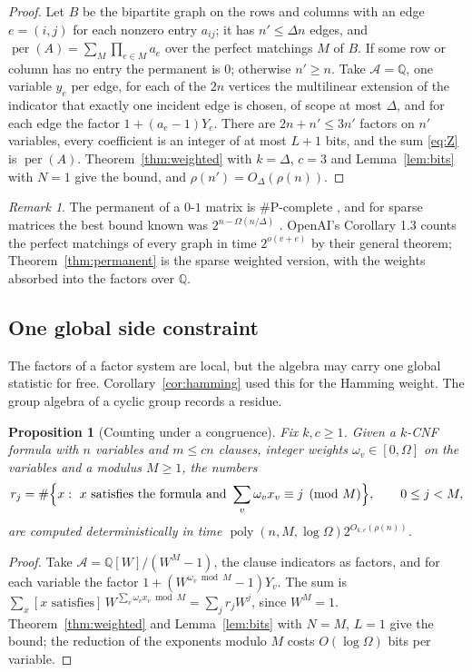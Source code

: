 \documentclass[11pt,reqno]{amsart}
\numberwithin{equation}{section}
\theoremstyle{plain}
\newtheorem{proposition}[theorem]{Proposition}
\theoremstyle{definition}
\theoremstyle{remark}
\newtheorem{remark}[theorem]{Remark}
\DeclareMathOperator{\poly}{poly}
\newcommand{\A}{\mathcal{A}}
\newcommand{\Q}{\mathbb{Q}}
\newcommand{\rhon}{\rho}
\newcommand{\oai}{OpenAI}
\begin{document}
\begin{proof}
Let $B$ be the bipartite graph on the rows and columns with an edge $e=(i,j)$ for
each nonzero entry $a_{ij}$; it has $n'\le\Delta n$ edges, and
$\operatorname{per}(A)=\sum_{M}\prod_{e\in M}a_e$ over the perfect matchings $M$
of $B$. If some row or column has no entry the permanent is $0$; otherwise
$n'\ge n$. Take $\A=\Q$, one variable $y_e$ per edge, for each of the $2n$
vertices the multilinear extension of the indicator that exactly one incident
edge is chosen, of scope at most $\Delta$, and for each edge the factor
$1+(a_e-1)Y_e$. There are $2n+n'\le3n'$ factors on $n'$ variables, every
coefficient is an integer of at most $L+1$ bits, and the sum \eqref{eq:Z} is
$\operatorname{per}(A)$. Theorem~\ref{thm:weighted} with $k=\Delta$, $c=3$ and
Lemma~\ref{lem:bits} with $N=1$ give the bound, and
$\rhon(n')=O_\Delta(\rhon(n))$.
\end{proof}

\begin{remark}
The permanent of a $0$-$1$ matrix is $\#$P-complete \cite{Val79}, and for
sparse matrices the best bound known was $2^{n-\Omega(n/\Delta)}$
\cite{CP15}. \oai{}'s Corollary 1.3 counts the perfect matchings of every graph
in time $2^{o(v+e)}$ by their general theorem; Theorem~\ref{thm:permanent}
is the sparse weighted version, with the weights absorbed into the factors over
$\Q$.
\end{remark}

\subsection{One global side constraint}\label{ssec:global}
The factors of a factor system are local, but the algebra may carry one global
statistic for free. Corollary~\ref{cor:hamming} used this for the Hamming weight.
The group algebra of a cyclic group records a residue.

\begin{proposition}[Counting under a congruence]\label{prop:modular}
Fix $k,c\ge1$. Given a $k$-CNF formula with $n$ variables and $m\le cn$ clauses,
integer weights $\omega_v\in[0,\Omega]$ on the variables and a modulus $M\ge1$, the
numbers
\[
  r_j=\#\Bigl\{x:\ x\text{ satisfies the formula and }\sum_v\omega_vx_v\equiv j\pmod M\Bigr\},\qquad 0\le j<M,
\]
are computed deterministically in time $\poly(n,M,\log\Omega)2^{O_{k,c}(\rhon(n))}$.
\end{proposition}

\begin{proof}
Take $\A=\Q[W]/(W^{M}-1)$, the clause indicators as factors, and for each
variable the factor $1+(W^{\omega_v\bmod M}-1)Y_v$. The sum is
$\sum_x[\text{$x$ satisfies}]\,W^{\sum_v\omega_vx_v\bmod M}=\sum_jr_jW^{j}$, since
$W^{M}=1$. Theorem~\ref{thm:weighted} and Lemma~\ref{lem:bits} with $N=M$,
$L=1$ give the bound; the reduction of the exponents modulo $M$ costs
$O(\log\Omega)$ bits per variable.
\end{proof}
\end{document}
